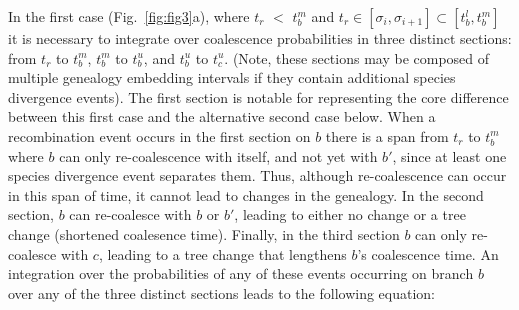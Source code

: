 \documentclass[11pt]{article}
\begin{document}




In the first case (Fig.~\ref{fig:fig3}a), where $t_r$ $<$ $t_b^m$ and 
$t_r \in [\sigma_i, \sigma_{i+1}] \subset [t_b^l,t_b^m]$
it is necessary to integrate over coalescence probabilities in three distinct sections:
from $t_r$ to $t_b^m$, $t_b^m$ to $t_b^u$, and $t_b^u$ to $t_c^u$. 
(Note, these sections may be composed of multiple genealogy embedding 
intervals if they contain additional species divergence events).
The first section is notable for representing the core
difference between this first case and the alternative second case below. 
When a recombination event occurs in the first section on $b$ there is a span 
from $t_r$ to $t_b^m$ where $b$ can only re-coalescence with itself, and not yet 
with $b'$, since at least one species divergence event separates them.
Thus, although re-coalescence can occur in this span of time, it cannot lead to 
changes in the genealogy. 
In the second section, 
$b$ can re-coalesce with $b$ or $b'$, leading to either no change or a tree 
change (shortened coalesence time). Finally, in the third section $b$ can 
only re-coalesce with $c$, leading to a tree change that lengthens $b$'s 
coalescence time. An integration over the probabilities of any of these events 
occurring on branch $b$ over any of the three distinct sections leads to the
following equation:
\end{document}
